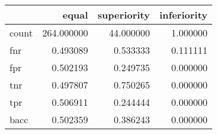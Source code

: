 \begin{tabular}{lrrr}
\toprule
{} &       equal &  superiority &  inferiority \\
\midrule
count &  264.000000 &    44.000000 &     1.000000 \\
fnr   &    0.493089 &     0.533333 &     0.111111 \\
fpr   &    0.502193 &     0.249735 &     0.000000 \\
tnr   &    0.497807 &     0.750265 &     0.000000 \\
tpr   &    0.506911 &     0.244444 &     0.000000 \\
bacc  &    0.502359 &     0.386243 &     0.000000 \\
\bottomrule
\end{tabular}
